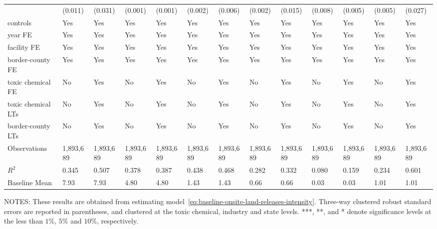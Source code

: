 \begin{table}[H]
{\begin{tabular}{@{}lllllllllllll@{}}
            & (0.011)   & (0.031)   & (0.001)   & (0.001)   & (0.002)   & (0.006)   & (0.002)   & (0.015)   & (0.008)   & (0.005) & (0.005) & (0.027)               \\
            controls           & Yes       & Yes       & Yes       & Yes       & Yes       & Yes       & Yes       & Yes       & Yes       & Yes       & Yes       & Yes       \\
            year FE            & Yes       & Yes       & Yes       & Yes       & Yes       & Yes       & Yes       & Yes       & Yes       & Yes       & Yes       & Yes       \\
            facility FE        & Yes       & Yes       & Yes       & Yes       & Yes       & Yes       & Yes       & Yes       & Yes       & Yes       & Yes       & Yes       \\
            border-county FE   & Yes       & Yes       & Yes       & Yes       & Yes       & Yes       & Yes       & Yes       & Yes       & Yes       & Yes       & Yes       \\
            toxic chemical FE  & No        & Yes       & No        & Yes       & No        & Yes       & No        & Yes       & No        & Yes       & No        & Yes       \\
            toxic chemical LTs & No        & Yes       & No        & Yes       & No        & Yes       & No        & Yes       & No        & Yes       & No        & Yes       \\
            border-county LTs  & No        & Yes       & No        & Yes       & No        & Yes       & No        & Yes       & No        & Yes       & No        & Yes       \\\midrule
            Observations       & 1,893,689 & 1,893,689 & 1,893,689 & 1,893,689 & 1,893,689 & 1,893,689 & 1,893,689 & 1,893,689 & 1,893,689 & 1,893,689 & 1,893,689 & 1,893,689 \\
            $R^2$              & 0.345     & 0.507     & 0.378     & 0.387     & 0.438     & 0.468     & 0.282     & 0.332     & 0.080     & 0.159     & 0.234     & 0.601     \\
            Baseline Mean      & 7.93      & 7.93      & 4.80      & 4.80      & 1.43      & 1.43      & 0.66      & 0.66      & 0.03      & 0.03      & 1.01      & 1.01      \\ \bottomrule\bottomrule
        \end{tabular}%
    }
    \begin{minipage}{\columnwidth}
        \vspace{0.05in}
        \tiny NOTES: These results are obtained from estimating model~\ref{eq:baseline-onsite-land-releases-intensity}. Three-way clustered robust standard errors are reported in parentheses, and clustered at the toxic chemical, industry and state levels. ***, **, and * denote significance levels at the less than $1\%$, $5\%$ and $10\%$, respectively.
    \end{minipage}
\end{table}